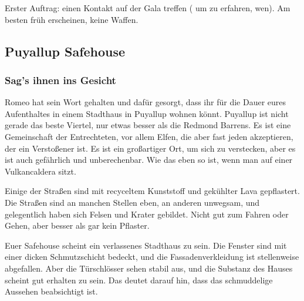 
Erster Auftrag: einen Kontakt auf der Gala treffen ( um zu erfahren, wen). Am besten früh erscheinen, keine Waffen.


\subsection{Puyallup Safehouse}

\subsubsection{Sag's ihnen ins Gesicht}

Romeo hat sein Wort gehalten und dafür gesorgt, dass ihr für die Dauer eures Aufenthaltes in einem Stadthaus in Puyallup wohnen könnt. Puyallup ist nicht gerade das beste Viertel, nur etwas besser als die Redmond Barrens. Es ist eine Gemeinschaft der Entrechteten, vor allem Elfen, die aber fast jeden akzeptieren, der ein Verstoßener ist. Es ist ein großartiger Ort, um sich zu verstecken, aber es ist auch gefährlich und unberechenbar. Wie das eben so ist, wenn man auf einer Vulkancaldera sitzt. 

Einige der Straßen sind mit recyceltem Kunststoff und gekühlter Lava gepflastert. Die Straßen sind an manchen Stellen eben, an anderen unwegsam, und gelegentlich haben sich Felsen und Krater gebildet. Nicht gut zum Fahren oder Gehen, aber besser als gar kein Pflaster.


Euer Safehouse scheint ein verlassenes Stadthaus zu sein. Die Fenster sind mit einer dicken Schmutzschicht bedeckt, und die Fassadenverkleidung ist stellenweise abgefallen. Aber die Türschlösser sehen stabil aus, und die Substanz des Hauses scheint gut erhalten zu sein. Das deutet darauf hin, dass das schmuddelige Aussehen beabsichtigt ist. 

